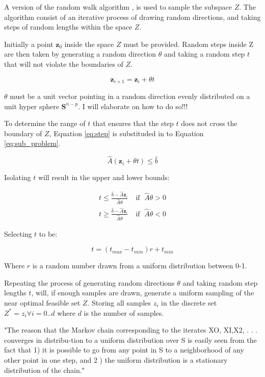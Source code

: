 \documentclass[11pt,a4paper,english]{article}
\begin{document}
A version of the random walk algorithm \cite{Smith1984}, is used to sample the subspace $Z$. The algorithm consist of an iterative process of drawing random directions, and taking steps of random lengths within the space $Z$. 

Initially a point $\mathbf{z}_0$ inside the space $Z$ must be provided. Random steps inside Z are then taken by generating a random direction $\theta$ and taking a random step $t$ that will not violate the boundaries of $Z$. 

\begin{equation}\label{eq:step}
	\mathbf{z}_{i+1} = \mathbf{z}_i + \theta t
\end{equation}

$\theta$ must be a unit vector pointing in a random direction evenly distributed on a unit hyper sphere $\mathbf{S}^{n-p}$. I will elaborate on how to do so!!!

To determine the range of $t$ that ensures that the step $t$ does not cross the boundary of $Z$, Equation \ref{eq:step} is substituded in to Equation \ref{eq:sub_problem}.

\begin{equation}
	\hat{A}(\mathbf{z}_i + \theta t) \leq \hat{b}
\end{equation}

Isolating $t$ will result in the upper and lower bounds:

\begin{align}
t \leq \frac{\hat{b}-\hat{A}\mathbf{z}_i}{\hat{A}\theta}& \; \text{if }  \; \hat{A}\theta>0\\
t \geq \frac{\hat{b}-\hat{A}\mathbf{z}_i}{\hat{A}\theta}& \; \text{if }  \; \hat{A}\theta<0
\end{align}

Selecting $t$ to be:

\begin{equation}
	t = (t_{max}-t_{min})r+t_{min}
\end{equation}

Where $r$ is a random number drawn from a uniform distribution between 0-1. 

Repeating the process of generating random directions $\theta$ and taking random step lengths $t$, will, if enough samples are drawn, generate a uniform sampling of the near optimal feasible set $Z$. Storing all samples $z_i$ in the discrete set $Z^* = {z_i \forall i=0..d}$ where $d$ is the number of samples.


"The reason that the Markov chain corresponding to the iterates XO, XI,X2, . . . converges in distribu-tion to a uniform distribution over S is easily seen from the fact that 1) it is possible to go from any point in S to a neighborhood of any other point in one step, and 2 ) the uniform distribution is a stationary distribution of the chain." \cite{Smith1996}
\end{document}
